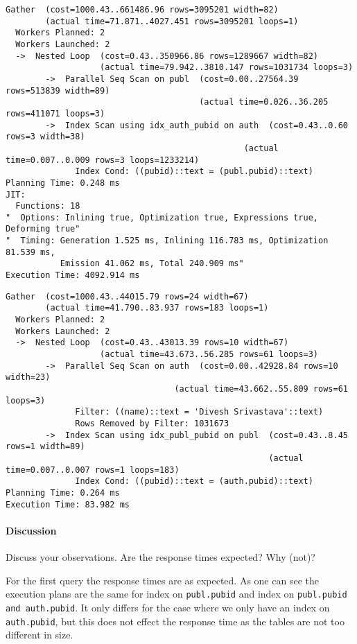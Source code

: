 \documentclass[11pt]{scrartcl}
\begin{document}
{\small
\parskip0pt\begin{verbatim}
Gather  (cost=1000.43..661486.96 rows=3095201 width=82)
        (actual time=71.871..4027.451 rows=3095201 loops=1)
  Workers Planned: 2
  Workers Launched: 2
  ->  Nested Loop  (cost=0.43..350966.86 rows=1289667 width=82)
                   (actual time=79.942..3810.147 rows=1031734 loops=3)
        ->  Parallel Seq Scan on publ  (cost=0.00..27564.39 rows=513839 width=89)
                                       (actual time=0.026..36.205 rows=411071 loops=3)
        ->  Index Scan using idx_auth_pubid on auth  (cost=0.43..0.60 rows=3 width=38)
                                                (actual time=0.007..0.009 rows=3 loops=1233214)
              Index Cond: ((pubid)::text = (publ.pubid)::text)
Planning Time: 0.248 ms
JIT:
  Functions: 18
"  Options: Inlining true, Optimization true, Expressions true, Deforming true"
"  Timing: Generation 1.525 ms, Inlining 116.783 ms, Optimization 81.539 ms,
           Emission 41.062 ms, Total 240.909 ms"
Execution Time: 4092.914 ms

\end{verbatim}}

  {\small
\parskip0pt\begin{verbatim}
Gather  (cost=1000.43..44015.79 rows=24 width=67)
        (actual time=41.790..83.937 rows=183 loops=1)
  Workers Planned: 2
  Workers Launched: 2
  ->  Nested Loop  (cost=0.43..43013.39 rows=10 width=67)
                   (actual time=43.673..56.285 rows=61 loops=3)
        ->  Parallel Seq Scan on auth  (cost=0.00..42928.84 rows=10 width=23)
                                  (actual time=43.662..55.809 rows=61 loops=3)
              Filter: ((name)::text = 'Divesh Srivastava'::text)
              Rows Removed by Filter: 1031673
        ->  Index Scan using idx_publ_pubid on publ  (cost=0.43..8.45 rows=1 width=89)
                                                     (actual time=0.007..0.007 rows=1 loops=183)
              Index Cond: ((pubid)::text = (auth.pubid)::text)
Planning Time: 0.264 ms
Execution Time: 83.982 ms

\end{verbatim}}

\paragraph{Discussion}

Discuss your observations.
Are the response times expected?
Why (not)?

For the first query the response times are as expected.
As one can see the execution plans are the same for index on \texttt{publ.pubid} and index on
\texttt{publ.pubid and auth.pubid}.
It only differs for the case where we only have an index on \texttt{auth.pubid}, but this does not effect the
response time as the tables are not too different in size.
\end{document}
